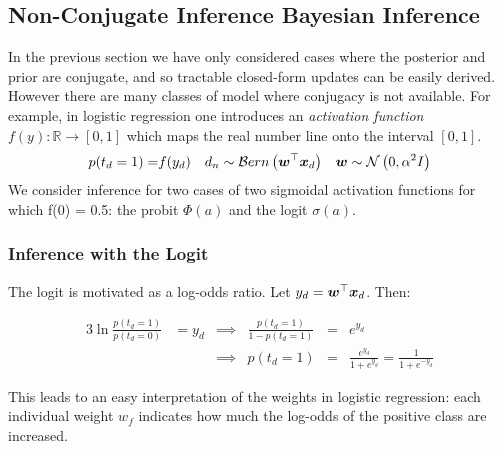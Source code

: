 


\subsection{Non-Conjugate Inference Bayesian Inference}
\label{sec:nonconj}
In the previous section we have only considered cases where the posterior and prior are conjugate, and so tractable closed-form updates can be easily derived. However there are many classes of model where conjugacy is not available. For example, in logistic regression one introduces an \emph{activation function} $f(y) : \mathbb{R} \rightarrow [0, 1]$ which maps the real number line onto the interval $[0,1]$.
\begin{align*}
p(t_d = 1) = & f(y_d) & d_n  & \sim \mathcal{B}ern \left( \bm w^\top\bm x_d\right) & \bm w & \sim \mathcal{N} \left( {0}, {\alpha^2 I} \right) \\
\end{align*}
We consider inference for two cases of two sigmoidal activation functions for which f(0) = 0.5: the probit $\Phi(a)$ and the logit $\sigma(a)$.

\subsubsection{Inference with the Logit}
The logit is motivated as a log-odds ratio. Let $y_d = \bm w^\top\bm x_d$. Then:

\begin{alignat}{3}
\ln \frac{p(t_d = 1)}{p(t_d = 0)}  & = y_d  &
\implies & \frac{p(t_d = 1)}{1 - p(t_d = 1)}  & = & e^{y_d} \\
& & \implies &  p(t_d = 1)                    & = & \frac{e^{y_d}}{1 + e^{y_d}} = \frac{1}{1+e^{-y_d}}
\end{alignat}

This leads to an easy interpretation of the weights in logistic regression: each individual weight $w_f$ indicates how much the log-odds of the positive class are increased.



